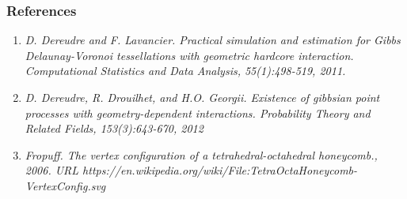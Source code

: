 \documentclass[c, 10pt]{beamer}
\begin{document}
% 
% 
% 
% 


\begin{frame}[noframenumbering]\frametitle{References}
	
	\begin{enumerate}
		\item \textit{D. Dereudre and F. Lavancier. Practical simulation and estimation for
Gibbs Delaunay-Voronoi tessellations with geometric hardcore interaction.
Computational Statistics and Data Analysis, 55(1):498-519, 2011.}

\item \textit{D. Dereudre, R. Drouilhet, and H.O. Georgii. Existence of gibbsian point
processes with geometry-dependent interactions. Probability Theory and
Related Fields, 153(3):643-670, 2012}


\item \textit{Fropuff. The vertex configuration of a tetrahedral-octahedral honeycomb., 2006.
	URL https://en.wikipedia.org/wiki/File:TetraOctaHoneycomb-VertexConfig.svg}
\end{enumerate}

\end{frame}
\end{document}
